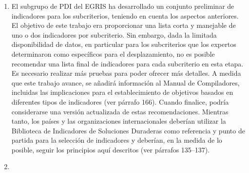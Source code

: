 \documentclass[
]{book}
\begin{document}
\begin{enumerate}
\item
  El subgrupo de PDI del EGRIS ha desarrollado un conjunto preliminar de indicadores para los subcriterios, teniendo en cuenta los aspectos anteriores. El objetivo de este trabajo era proporcionar una lista corta y manejable de uno o dos indicadores por subcriterio. Sin embargo, dada la limitada disponibilidad de datos, en particular para los subcriterios que los expertos determinaron como específicos para el desplazamiento, no es posible recomendar una lista final de indicadores para cada subcriterio en esta etapa. Es necesario realizar más pruebas para poder ofrecer más detalles. A medida que este trabajo avance, se añadirá información al Manual de Compiladores, incluidas las implicaciones para el establecimiento de objetivos basados en diferentes tipos de indicadores (ver párrafo 166). Cuando finalice, podría considerarse una versión actualizada de estas recomendaciones. Mientras tanto, los países y las organizaciones internacionales deberían utilizar la Biblioteca de Indicadores de Soluciones Duraderas como referencia y punto de partida para la selección de indicadores y deberían, en la medida de lo posible, seguir los principios aquí descritos (ver párrafos 135--137).
\item ~
  \hypertarget{anuxe1lisis-comparativo-con-otros-grupos-de-poblaciuxf3n}{%
}
\end{enumerate}
\end{document}
